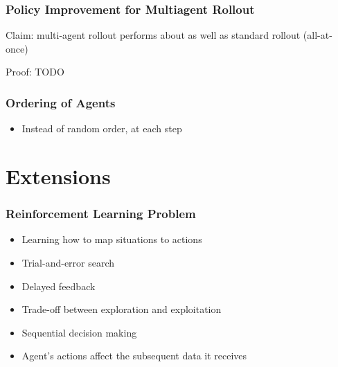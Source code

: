 \documentclass{beamer}
\begin{document}

\begin{frame}
	\frametitle{Policy Improvement for Multiagent Rollout}
	
	Claim: multi-agent rollout performs about as well as
	standard rollout (all-at-once)
	
	Proof: TODO 	
	
	
	
\end{frame}

    \begin{frame}
    	
	\frametitle{Ordering of Agents}
	
	
	
	\begin{itemize}
		\item Instead of random order, at each step
	\end{itemize}
	
	
	\end{frame}













    \section{Extensions}

    \begin{frame}
        \frametitle{Reinforcement Learning Problem}
        \begin{itemize}
            \item Learning how to map situations to actions
            \item Trial-and-error search
            \item Delayed feedback
            \item Trade-off between exploration and exploitation
            \item Sequential decision making
            \item Agent's actions affect the subsequent data it receives
        \end{itemize}
    \end{frame}
\end{document}
